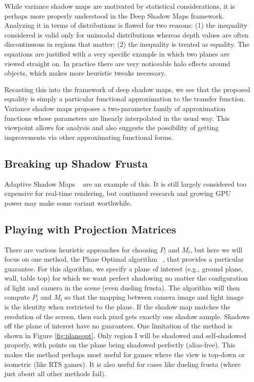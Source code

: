 \documentclass[]{article}  %
\begin{document}
While variance shadow maps are motivated by statistical considerations, it is perhaps more properly understood in the Deep Shadow Maps framework.  Analyzing it in terms of distributions is flawed for two reasons: (1) the inequality considered is valid only for unimodal distributions whereas depth values are often discontinuous in regions that matter; (2) the inequality is treated as equality.  The equations are justified with a very specific example in which two planes are viewed straight on.  In practice there are very noticeable halo effects around objects, which makes more heuristic tweaks necessary.

Recasting this into the framework of deep shadow maps, we see that the proposed equality is simply a particular functional approximation to the transfer function.  Variance shadow maps proposes a two-parameter family of approximation functions whose parameters are linearly interpolated in the usual way.  This viewpoint allows for analysis and also suggests the possibility of getting improvements via other approximating functional forms.  

\subsection{Breaking up Shadow Frusta}

Adaptive Shadow Maps ~\cite{FFB01} are an example of this.  It is still largely considered too expensive for real-time rendering, but continued research and growing GPU power may make some variant worthwhile.  

\subsection{Playing with Projection Matrices}
\label{sect:planeopt}
There are various heuristic approaches for choosing $P_l$ and $M_l$, but here we will focus on one method, the Plane Optimal algorithm ~\cite{Chong04}, that provides a particular guarantee.  For this algorithm, we specify a plane of interest (e.g., ground plane, wall, table top) for which we want perfect shadowing no matter the configuration of light and camera in the scene (even dueling frusta).  The algorithm will then compute $P_l$ and $M_l$ so that the mapping between camera image and light image is the identity when restricted to the plane.  If the shadow map matches the resolution of the screen, then each pixel gets exactly one shadow sample.  Shadows off the plane of interest have no guarantees.  
One limitation of the method is shown in Figure \ref{fig:planeopt}.  Only region I will be shadowed and self-shadowed properly, with points on the plane being shadowed perfectly (alias-free).  This makes the method perhaps most useful for games where the view is top-down or isometric (like RTS games).  It is also useful for cases like dueling frusta (where just about all other methods fail).  
\end{document}
